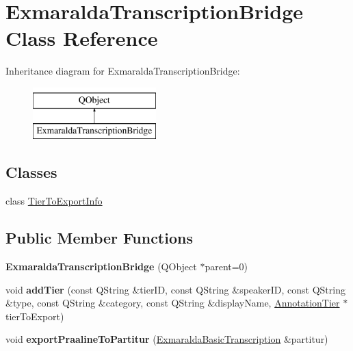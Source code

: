 \hypertarget{class_exmaralda_transcription_bridge}{}\section{Exmaralda\+Transcription\+Bridge Class Reference}
\label{class_exmaralda_transcription_bridge}
Inheritance diagram for Exmaralda\+Transcription\+Bridge\+:\begin{figure}[H]
\begin{center}
\leavevmode
\includegraphics[height=2.000000cm]{class_exmaralda_transcription_bridge}
\end{center}
\end{figure}
\subsection*{Classes}
\begin{DoxyCompactItemize}
\item 
class \hyperlink{class_exmaralda_transcription_bridge_1_1_tier_to_export_info}{Tier\+To\+Export\+Info}
\end{DoxyCompactItemize}
\subsection*{Public Member Functions}
\begin{DoxyCompactItemize}
\item 
\mbox{\label{class_exmaralda_transcription_bridge_a2fa2ac03488832a280321558b0c6d88d}} 
{\bfseries Exmaralda\+Transcription\+Bridge} (Q\+Object $\ast$parent=0)
\item 
\mbox{\label{class_exmaralda_transcription_bridge_ac19cbf007cb5d0a4fbd11c450919801a}} 
void {\bfseries add\+Tier} (const Q\+String \&tier\+ID, const Q\+String \&speaker\+ID, const Q\+String \&type, const Q\+String \&category, const Q\+String \&display\+Name, \hyperlink{class_annotation_tier}{Annotation\+Tier} $\ast$tier\+To\+Export)
\item 
\mbox{\label{class_exmaralda_transcription_bridge_a142c275e00354c7fdef8f30f9b520f3a}} 
void {\bfseries export\+Praaline\+To\+Partitur} (\hyperlink{class_exmaralda_basic_transcription}{Exmaralda\+Basic\+Transcription} \&partitur)
\end{DoxyCompactItemize}


